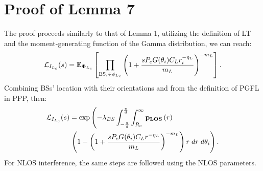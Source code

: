 \documentclass[journal]{IEEEtran}
\begin{document}
\section{Proof of Lemma 7}



The proof proceeds similarly to that of Lemma 1, utilizing the definition of LT and the moment-generating function of the Gamma distribution, we can reach:
\small
\begin{equation}
\mathcal{L}_{I_{L_c}} (s)=\mathbb{E}_{\bold\Phi_{L_c}}\left[\prod\limits_{\substack{\text{BS}_i\in \phi_{L_c}}}\left(1+\frac{  s P_c G (\theta_i)C_L r_i^{-\eta_L}}{m_L}\right)^{-m_L}\right].
\end{equation}
\normalsize
Combining BSs' location with their orientations and from the definition of PGFL in PPP, then:
\begin{equation}
\begin{aligned}
\mathcal{L}_{I_{L_c}} (s)&=\exp\left(- \lambda_{BS} \int_{-\frac{\pi}{d}}^{\frac{\pi}{d}}\int_{R_o}^{\infty}\bold p_{\bold{LOS}}\left(r\right) \right.\\ 
&  \left.\left(1-\left( 1+\frac{s P_c G(\theta_i)C_L r^{-\eta_L}}{m_L}\right)^{-m_L}    \right) r\;dr \;d\theta_i \right).
 \end{aligned}
\end{equation}
For NLOS interference, the same steps are followed using the NLOS parameters.
\end{document}

